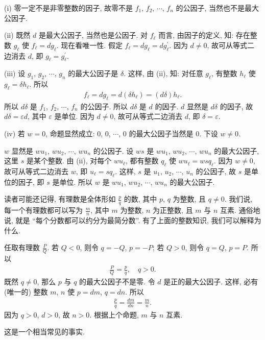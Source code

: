 \begin{pf}
    (i) 零一定不是非零整数的因子, 故零不是 $f_1$, $f_2$, $\cdots$, $f_n$ 的公因子, 当然也不是最大公因子.

    (ii) 既然 $d$ 是最大公因子, 当然也是公因子. 对 $f_{\ell}$ 而言, 由因子的定义, 知: 存在整数 $g_{\ell}$ 使 $f_{\ell} = dg_{\ell}$. 现在看唯一性. 假定 $f_{\ell} = dg_{\ell} = dg_{\ell}^{\prime}$. 因为 $d \neq 0$, 故可从等式二边消去 $d$, 即 $g_{\ell} = g_{\ell}^{\prime}$.

    (iii) 设 $g_1$, $g_2$, $\cdots$, $g_n$ 的最大公因子是 $\delta$. 这样, 由 (ii), 知: 对任意 $g_{\ell}$, 有整数 $h_{\ell}$ 使 $g_{\ell} = \delta h_{\ell}$. 所以
    \begin{align*}
        f_{\ell} = dg_{\ell} = d(\delta h_{\ell}) = (d\delta) h_{\ell}.
    \end{align*}
    所以 $d\delta$ 是 $f_1$, $f_2$, $\cdots$, $f_n$ 的公因子. 所以 $d\delta$ 是 $d$ 的因子. $d$ 显然是 $d\delta$ 的因子, 故 $d\delta = \varepsilon d$, 其中 $\varepsilon$ 是单位. 因为 $d \neq 0$, 故可从等式二边消去 $d$, 即 $\delta = \varepsilon$.

    (iv) 若 $w = 0$, 命题显然成立: $0$, $0$, $\cdots$, $0$ 的最大公因子当然是 $0$. 下设 $w \neq 0$.

    $w$ 显然是 $wu_1$, $wu_2$, $\cdots$, $wu_n$ 的公因子. 设 $ws$ 是 $wu_1$, $wu_2$, $\cdots$, $wu_n$ 的最大公因子, 这里 $s$ 是某个整数. 由 (ii), 对每个 $wu_{\ell}$, 都有整数 $q_{\ell}$ 使 $wu_{\ell} = wsq_{\ell}$. 因为 $w \neq 0$, 故可从等式二边消去 $w$, 即 $u_{\ell} = sq_{\ell}$. 这样, $s$ 是 $u_1$, $u_2$, $\cdots$, $u_n$ 的公因子, 故 $s$ 是单位的因子, 即 $s$ 是单位. 所以 $w$ 是 $wu_1$, $wu_2$, $\cdots$, $wu_n$ 的最大公因子.
\end{pf}

\begin{example}
    读者可能还记得, 有理数是全体形如 $\frac{p}{q}$ 的数, 其中 $p$, $q$ 为整数, 且 $q \neq 0$. 我们说, 每一个有理数都可以写为 $\frac{m}{n}$, 其中 $m$ 为整数, $n$ 为正整数, 且 $m$ 与 $n$ 互素. 通俗地说, 就是 ``每个分数都可以约分为最简分数''. 有了上面的整数知识, 我们可以解释为什么.

    任取有理数 $\frac{P}{Q}$. 若 $Q < 0$, 则令 $q = -Q$, $p = -P$; 若 $Q > 0$, 则令 $q = Q$, $p = P$. 所以
    \begin{align*}
        \frac{P}{Q} = \frac{p}{q}, \quad q > 0.
    \end{align*}
    既然 $q \neq 0$, 那么 $p$ 与 $q$ 的最大公因子不是零. 令 $d$ 是正的最大公因子. 这样, 必有 (唯一的) 整数 $m$, $n$ 使 $p = dm$, $q = dn$. 所以
    \begin{align*}
        \frac{p}{q} = \frac{dm}{dn} = \frac{m}{n}.
    \end{align*}
    因为 $q > 0$, $d > 0$, 故 $n > 0$. 根据上个命题, $m$ 与 $n$ 互素.

    这是一个相当常见的事实.
\end{example}

